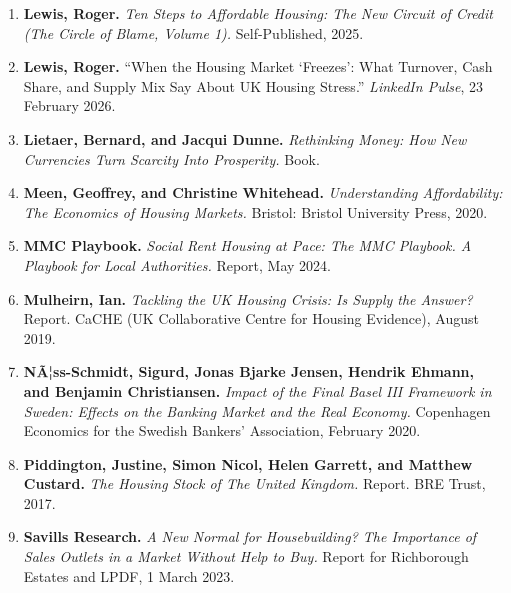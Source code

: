 \documentclass[
]{article}
\begin{document}
\begin{enumerate}
{{  Roger.} ``Housing Credit, Broad Money, and the Real Economy: A UK View
  (or, When `Macroprudence' Becomes a Housing Scheme).'' \emph{LinkedIn
  Pulse}, 23 February 2026.}
\item
  \protect{}\label{ref-lewis-tensteps}{\textbf{Lewis,
  Roger.} \emph{Ten Steps to Affordable Housing: The New Circuit of
  Credit (The Circle of Blame, Volume 1).} Self-Published, 2025.}
\item
  \protect{}\label{ref-lewis-linkedin-freeze}{\textbf{Lewis,
  Roger.} ``When the Housing Market `Freezes': What Turnover, Cash
  Share, and Supply Mix Say About UK Housing Stress.'' \emph{LinkedIn
  Pulse}, 23 February 2026.}
\item
  \protect{}\label{ref-lietaer}{\textbf{Lietaer, Bernard,
  and Jacqui Dunne.} \emph{Rethinking Money: How New Currencies Turn
  Scarcity Into Prosperity.} Book.}
\item
  \protect{}\label{ref-meen2020}{\textbf{Meen, Geoffrey,
  and Christine Whitehead.} \emph{Understanding Affordability: The
  Economics of Housing Markets.} Bristol: Bristol University Press,
  2020.}
\item
  \protect{}\label{ref-mmcplaybook2024}{\textbf{MMC
  Playbook.} \emph{Social Rent Housing at Pace: The MMC Playbook. A
  Playbook for Local Authorities.} Report, May 2024.}
\item
  \protect{}\label{ref-mulheirn2019}{\textbf{Mulheirn,
  Ian.} \emph{Tackling the UK Housing Crisis: Is Supply the Answer?}
  Report. CaCHE (UK Collaborative Centre for Housing Evidence), August
  2019.}
\item
  \protect{}\label{ref-naess2020}{\textbf{NÃ¦ss-Schmidt,
  Sigurd, Jonas Bjarke Jensen, Hendrik Ehmann, and Benjamin
  Christiansen.} \emph{Impact of the Final Basel III Framework in
  Sweden: Effects on the Banking Market and the Real Economy.}
  Copenhagen Economics for the Swedish Bankers' Association, February
  2020.}
\item
  \protect{}\label{ref-piddington2017}{\textbf{Piddington,
  Justine, Simon Nicol, Helen Garrett, and Matthew Custard.} \emph{The
  Housing Stock of The United Kingdom.} Report. BRE Trust, 2017.}
\item
  \protect{}\label{ref-savills2023}{\textbf{Savills
  Research.} \emph{A New Normal for Housebuilding? The Importance of
  Sales Outlets in a Market Without Help to Buy.} Report for Richborough
  Estates and LPDF, 1 March 2023.}

\end{enumerate}
\end{document}

